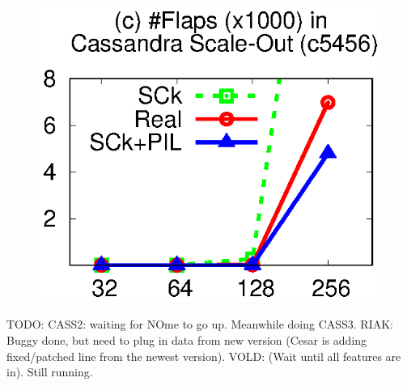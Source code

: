 \begin{figure}[t]
{\includegraphics[width=\fgw]{F/old-bugs/eps/cass4.eps}
}


\vminfive

\vminfive
\end{figure}




TODO: CASS2: waiting for NOme to go up.
Meanwhile doing CASS3. 
%
RIAK: Buggy done, but need to plug in data from new version
(Cesar is adding fixed/patched line from the newest version).
%
VOLD: (Wait until all features are in).  Still running.
\fi
